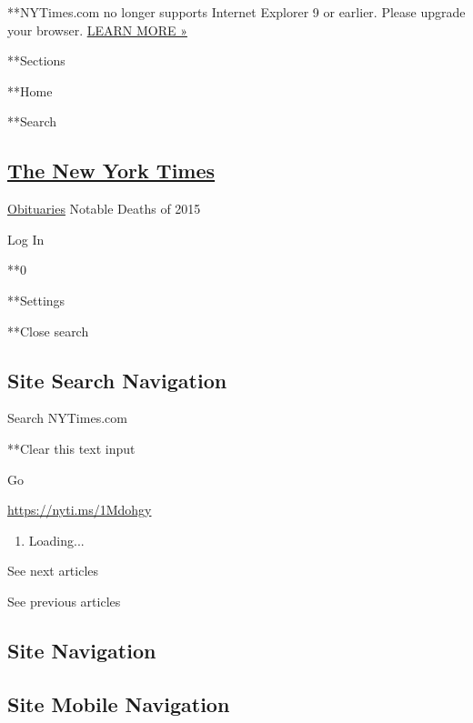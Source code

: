  **NYTimes.com no longer supports Internet Explorer 9 or earlier. Please
upgrade your browser.
\href{http://www.nytimes3xbfgragh.onion/content/help/site/ie9-support.html}{LEARN
MORE »}

**Sections

**Home

**Search

\hypertarget{the-new-york-times}{%
\subsection{\texorpdfstring{\href{http://www.nytimes3xbfgragh.onion/}{The
New York Times}}{The New York Times}}\label{the-new-york-times}}


\href{https://www.nytimes3xbfgragh.onion/section/obituaries}{Obituaries}
\textbar{}Notable Deaths of 2015

Log In

**0

**Settings

**Close search

\hypertarget{site-search-navigation}{%
\subsection{Site Search Navigation}\label{site-search-navigation}}

Search NYTimes.com

**Clear this text input

Go

\url{https://nyti.ms/1Mdohgy}

\begin{enumerate}
\def\labelenumi{\arabic{enumi}.}
\item
  Loading...
\end{enumerate}

See next articles

See previous articles

\hypertarget{site-navigation}{%
\subsection{Site Navigation}\label{site-navigation}}

\hypertarget{site-mobile-navigation}{%
\subsection{Site Mobile Navigation}\label{site-mobile-navigation}}

